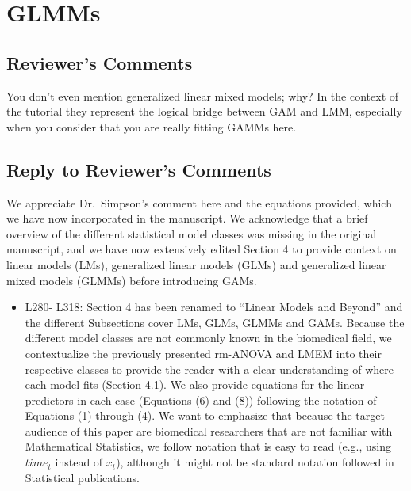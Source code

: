\documentclass[
]{article}
\providecommand{\tightlist}{%
  \setlength{\itemsep}{0pt}\setlength{\parskip}{0pt}}
\begin{document}
\hypertarget{glmms}{%
\section{GLMMs}\label{glmms}}

\hypertarget{reviewers-comments-2}{%
\subsection{Reviewer's Comments}\label{reviewers-comments-2}}

You don't even mention generalized linear mixed models; why? In the context of the tutorial they represent the logical bridge between GAM and LMM, especially when you consider that you are really fitting GAMMs here.

\hypertarget{section-3}{%
\subsection{\texorpdfstring{\textcolor{reviewersblue} {Reply to Reviewer's Comments}}{}}\label{section-3}}

We appreciate Dr.~Simpson's comment here and the equations provided, which we have now incorporated in the manuscript. We acknowledge that a brief overview of the different statistical model classes was missing in the original manuscript, and we have now extensively edited Section 4 to provide context on linear models (LMs), generalized linear models (GLMs) and generalized linear mixed models (GLMMs) before introducing GAMs.

\begin{itemize}
\tightlist
\item
  L280- L318: Section 4 has been renamed to ``Linear Models and Beyond'' and the different Subsections cover LMs, GLMs, GLMMs and GAMs. Because the different model classes are not commonly known in the biomedical field, we contextualize the previously presented rm-ANOVA and LMEM into their respective classes to provide the reader with a clear understanding of where each model fits (Section 4.1). We also provide equations for the linear predictors in each case (Equations (6) and (8)) following the notation of Equations (1) through (4). We want to emphasize that because the target audience of this paper are biomedical researchers that are not familiar with Mathematical Statistics, we follow notation that is easy to read (e.g., using \(time_t\) instead of \(x_t\)), although it might not be standard notation followed in Statistical publications.
\end{itemize}
\end{document}
